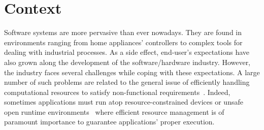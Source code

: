 \section{Context}

Software systems are more pervasive than ever nowadays.
They are found in environments ranging from home appliances' controllers to complex tools for dealing with industrial processes.
As a side effect, end-user's expectations have also grown along the development of the software/hardware industry.
However, the industry faces several challenges while coping with these expectations.
A large number of such problems are related to the general issue of efficiently handling computational resources to satisfy non-functional requirements~\cite{}.
Indeed, sometimes applications must run atop resource-constrained devices or unsafe open runtime environments~\cite{baresi2006toward} where efficient resource management is of paramount importance to guarantee applications' proper execution.


